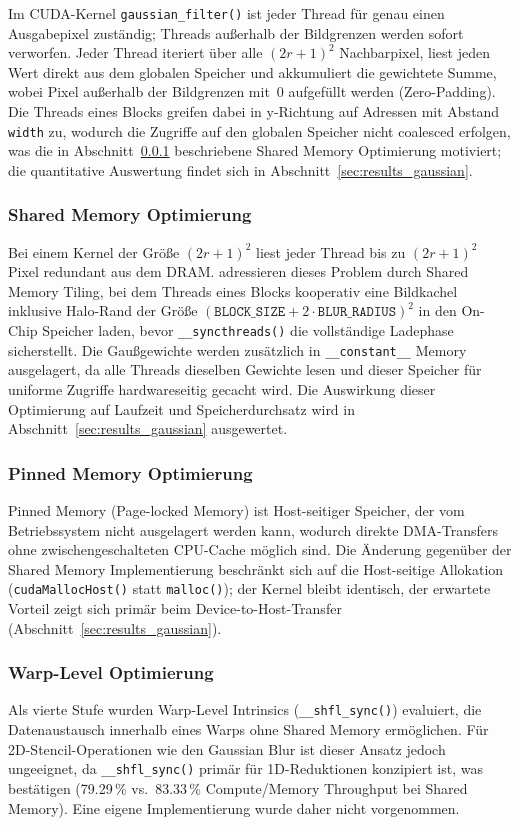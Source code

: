 Im CUDA-Kernel \texttt{gaussian\_filter()} ist jeder Thread für genau
einen Ausgabepixel zuständig; Threads außerhalb der Bildgrenzen werden
sofort verworfen. Jeder Thread iteriert über alle $(2r+1)^2$
Nachbarpixel, liest jeden Wert direkt aus dem globalen Speicher und
akkumuliert die gewichtete Summe, wobei Pixel außerhalb der
Bildgrenzen mit~0 aufgefüllt werden (Zero-Padding). Die Threads eines
Blocks greifen dabei in y-Richtung auf Adressen mit Abstand
\texttt{width} zu, wodurch die Zugriffe auf den globalen Speicher nicht
coalesced erfolgen, was die in Abschnitt~\ref{sec:shared_memory_gaussian}
beschriebene Shared Memory Optimierung motiviert; die quantitative
Auswertung findet sich in Abschnitt~\ref{sec:results_gaussian}.

\subsubsection{Shared Memory Optimierung}
\label{sec:shared_memory_gaussian}

Bei einem Kernel der Größe $(2r+1)^2$ liest jeder Thread bis zu
$(2r+1)^2$ Pixel redundant aus dem DRAM. \cite[S.~2]{horvath2023}
adressieren dieses Problem durch Shared Memory Tiling, bei dem Threads
eines Blocks kooperativ eine Bildkachel inklusive Halo-Rand der Größe
$(\texttt{BLOCK\_SIZE} + 2 \cdot \texttt{BLUR\_RADIUS})^2$ in den
On-Chip Speicher laden, bevor \texttt{\_\_syncthreads()} die
vollständige Ladephase sicherstellt. Die Gaußgewichte werden zusätzlich
in \texttt{\_\_constant\_\_} Memory ausgelagert, da alle Threads
dieselben Gewichte lesen und dieser Speicher für uniforme Zugriffe
hardwareseitig gecacht wird. Die Auswirkung dieser Optimierung auf
Laufzeit und Speicherdurchsatz wird in
Abschnitt~\ref{sec:results_gaussian} ausgewertet.

\subsubsection{Pinned Memory Optimierung}
\label{sec:pinned_memory_gaussian}

Pinned Memory (Page-locked Memory) ist Host-seitiger Speicher, der vom
Betriebssystem nicht ausgelagert werden kann, wodurch direkte
DMA-Transfers ohne zwischengeschalteten CPU-Cache möglich sind. Die
Änderung gegenüber der Shared Memory Implementierung beschränkt sich
auf die Host-seitige Allokation (\texttt{cudaMallocHost()} statt
\texttt{malloc()}); der Kernel bleibt identisch, der erwartete Vorteil
zeigt sich primär beim Device-to-Host-Transfer
(Abschnitt~\ref{sec:results_gaussian}).

\subsubsection{Warp-Level Optimierung}

Als vierte Stufe wurden Warp-Level Intrinsics
(\texttt{\_\_shfl\_sync()}) evaluiert, die Datenaustausch innerhalb
eines Warps ohne Shared Memory ermöglichen. Für 2D-Stencil-Operationen
wie den Gaussian Blur ist dieser Ansatz jedoch ungeeignet, da
\texttt{\_\_shfl\_sync()} primär für 1D-Reduktionen konzipiert ist, was
\cite{yadav2025} bestätigen (79.29\,\% vs.\ 83.33\,\% Compute/Memory
Throughput bei Shared Memory). Eine eigene Implementierung wurde daher
nicht vorgenommen.